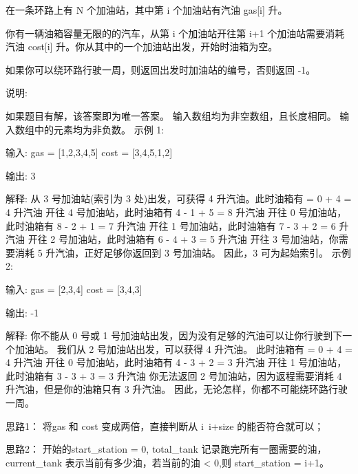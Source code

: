 在一条环路上有 N 个加油站，其中第 i 个加油站有汽油 gas[i] 升。

你有一辆油箱容量无限的的汽车，从第 i 个加油站开往第 i+1 个加油站需要消耗汽油 cost[i] 升。你从其中的一个加油站出发，开始时油箱为空。

如果你可以绕环路行驶一周，则返回出发时加油站的编号，否则返回 -1。

说明: 

如果题目有解，该答案即为唯一答案。
输入数组均为非空数组，且长度相同。
输入数组中的元素均为非负数。
示例 1:

输入: 
gas  = [1,2,3,4,5]
cost = [3,4,5,1,2]

输出: 3

解释:
从 3 号加油站(索引为 3 处)出发，可获得 4 升汽油。此时油箱有 = 0 + 4 = 4 升汽油
开往 4 号加油站，此时油箱有 4 - 1 + 5 = 8 升汽油
开往 0 号加油站，此时油箱有 8 - 2 + 1 = 7 升汽油
开往 1 号加油站，此时油箱有 7 - 3 + 2 = 6 升汽油
开往 2 号加油站，此时油箱有 6 - 4 + 3 = 5 升汽油
开往 3 号加油站，你需要消耗 5 升汽油，正好足够你返回到 3 号加油站。
因此，3 可为起始索引。
示例 2:

输入: 
gas  = [2,3,4]
cost = [3,4,3]

输出: -1

解释:
你不能从 0 号或 1 号加油站出发，因为没有足够的汽油可以让你行驶到下一个加油站。
我们从 2 号加油站出发，可以获得 4 升汽油。 此时油箱有 = 0 + 4 = 4 升汽油
开往 0 号加油站，此时油箱有 4 - 3 + 2 = 3 升汽油
开往 1 号加油站，此时油箱有 3 - 3 + 3 = 3 升汽油
你无法返回 2 号加油站，因为返程需要消耗 4 升汽油，但是你的油箱只有 3 升汽油。
因此，无论怎样，你都不可能绕环路行驶一周。

























思路1：
将gas 和 cost 变成两倍，直接判断从 i~i+size 的能否符合就可以；

思路2：
开始的start_station = 0, total_tank 记录跑完所有一圈需要的油，current_tank 表示当前有多少油，若当前的油 < 0,则 start_station = i+1。



























